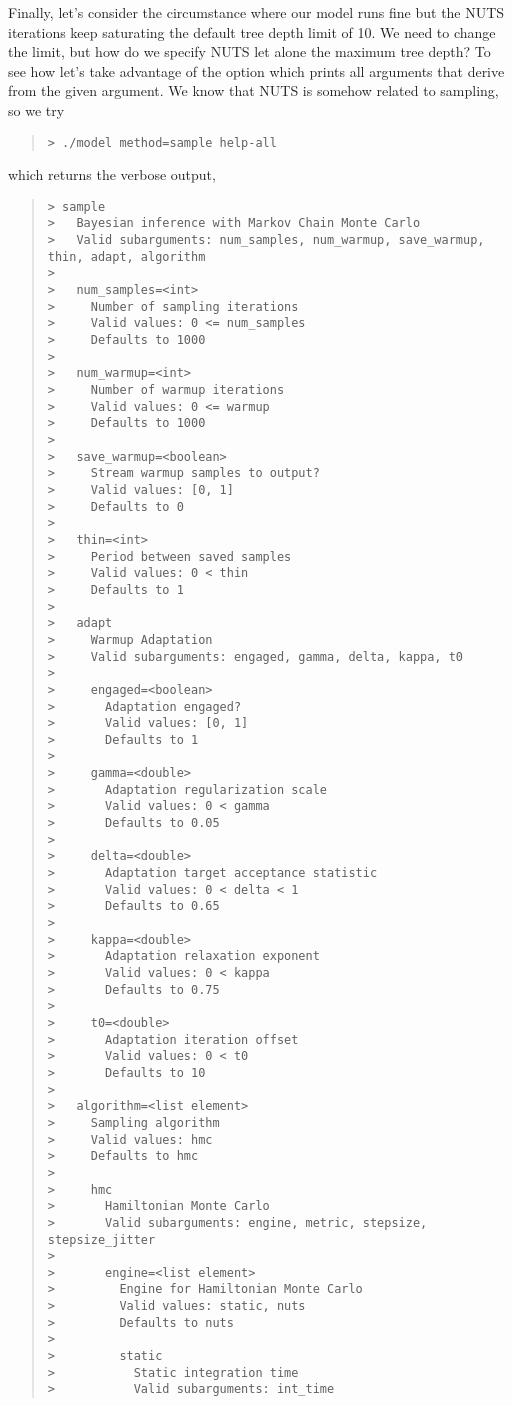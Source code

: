 Finally, let's consider the circumstance where our model runs fine but
the NUTS iterations keep saturating the default tree depth limit of 10.  We need
to change the limit, but how do we specify NUTS let alone the maximum tree depth?
To see how let's take advantage of the  option which prints all
arguments that derive from the given argument.  We know that NUTS is somehow
related to sampling, so we try
%
\begin{quote}
\begin{Verbatim}[fontshape=sl,fontsize=\small]
> ./model method=sample help-all
\end{Verbatim}
\end{quote}
%
which returns the verbose output,
%
%
\begin{quote}
\begin{Verbatim}[fontshape=sl,fontsize=\small]
> sample
>   Bayesian inference with Markov Chain Monte Carlo
>   Valid subarguments: num_samples, num_warmup, save_warmup, thin, adapt, algorithm
> 
>   num_samples=<int>
>     Number of sampling iterations
>     Valid values: 0 <= num_samples
>     Defaults to 1000
> 
>   num_warmup=<int>
>     Number of warmup iterations
>     Valid values: 0 <= warmup
>     Defaults to 1000
> 
>   save_warmup=<boolean>
>     Stream warmup samples to output?
>     Valid values: [0, 1]
>     Defaults to 0
> 
>   thin=<int>
>     Period between saved samples
>     Valid values: 0 < thin
>     Defaults to 1
> 
>   adapt
>     Warmup Adaptation
>     Valid subarguments: engaged, gamma, delta, kappa, t0
> 
>     engaged=<boolean>
>       Adaptation engaged?
>       Valid values: [0, 1]
>       Defaults to 1
> 
>     gamma=<double>
>       Adaptation regularization scale
>       Valid values: 0 < gamma
>       Defaults to 0.05
> 
>     delta=<double>
>       Adaptation target acceptance statistic
>       Valid values: 0 < delta < 1
>       Defaults to 0.65
> 
>     kappa=<double>
>       Adaptation relaxation exponent
>       Valid values: 0 < kappa
>       Defaults to 0.75
> 
>     t0=<double>
>       Adaptation iteration offset
>       Valid values: 0 < t0
>       Defaults to 10
> 
>   algorithm=<list element>
>     Sampling algorithm
>     Valid values: hmc
>     Defaults to hmc
> 
>     hmc
>       Hamiltonian Monte Carlo
>       Valid subarguments: engine, metric, stepsize, stepsize_jitter
> 
>       engine=<list element>
>         Engine for Hamiltonian Monte Carlo
>         Valid values: static, nuts
>         Defaults to nuts
> 
>         static
>           Static integration time
>           Valid subarguments: int_time

\end{Verbatim}
\end{quote}
